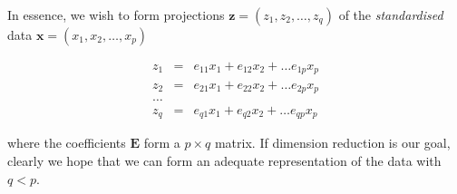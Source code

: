 In essence, we wish to form projections $\boldsymbol{z} = (z_{1}, z_{2}, \ldots, z_{q})$  of the \emph{standardised} data $\boldsymbol{x} = (x_{1}, x_{2}, \ldots, x_{p})$ 

\begin{eqnarray*}
z_{1} &=& e_{11} x_{1} + e_{12} x_{2} + \ldots e_{1p} x_{p}\\
z_{2} &=& e_{21} x_{1} + e_{22} x_{2} + \ldots e_{2p} x_{p}\\
\ldots\\
z_{q} &=& e_{q1} x_{1} + e_{q2} x_{2} + \ldots e_{qp} x_{p}
\end{eqnarray*}

where the coefficients  $\boldsymbol{E}$ form a $p \times q$ matrix.   If dimension reduction is our goal, clearly we hope that we can form an adequate representation of the data with $q<p$.   
